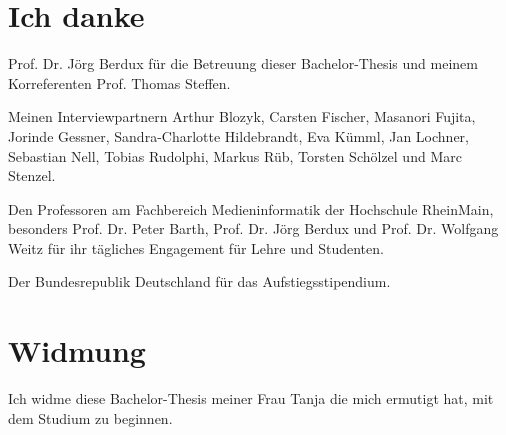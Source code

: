 \documentclass[11pt,a4paper]{article}
\begin{document}
\vspace{1cm}

\pagebreak

\section*{Ich danke}

Prof. Dr. Jörg Berdux für die Betreuung dieser Bachelor-Thesis und meinem Korreferenten Prof. Thomas Steffen.

Meinen Interviewpartnern Arthur Blozyk, Carsten Fischer, Masanori Fujita, Jorinde Gessner, Sandra-Charlotte Hildebrandt, Eva Kümml, Jan Lochner, Sebastian Nell, Tobias Rudolphi, Markus Rüb, Torsten Schölzel und Marc Stenzel.

Den Professoren am Fachbereich Medieninformatik der Hochschule RheinMain, besonders Prof. Dr. Peter Barth, Prof. Dr. Jörg Berdux und Prof. Dr. Wolfgang Weitz für ihr tägliches Engagement für Lehre und Studenten.

Der Bundesrepublik Deutschland für das Aufstiegsstipendium.

\section*{Widmung}

Ich widme diese Bachelor-Thesis meiner Frau Tanja die mich ermutigt hat, mit dem Studium zu beginnen.

\pagebreak



\pagebreak

\tableofcontents

\pagebreak

\setcounter{page}{1}



\pagebreak



\pagebreak



\pagebreak







\pagebreak


\end{document}
